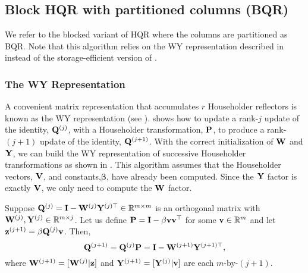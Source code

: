 \subsection{Block HQR with partitioned columns (BQR)}\label{sec:BQR}
We refer to the blocked variant of HQR where the columns are partitioned as BQR. 
Note that this algorithm relies on the WY representation described in \cite{Bischof1987} instead of the storage-efficient version of \cite{Schreiber1989}.
\subsubsection{The WY Representation}
A convenient matrix representation that accumulates $r$ Householder reflectors is known as the WY representation (see \cite{Bischof1987,golub2013matrix}).
 shows how to update a rank-$j$ update of the identity, $\mathbf{Q}^{(j)}$, with a Householder transformation, $\mathbf{P}$, to produce a rank-$(j+1)$ update of the identity, $\mathbf{Q}^{(j+1)}$. 
With the correct initialization of $\mathbf{W}$ and $\mathbf{Y}$, we can build the WY representation of successive Householder transformations as shown in . 
This algorithm assumes that the Householder vectors, $\mathbf{V}$, and constants,$\bm{\beta}$, have already been computed.
Since the $\mathbf{Y}$ factor is exactly $\mathbf{V}$, we only need to compute the $\mathbf{W}$ factor.
\begin{lemma}\label{lem:WY}
	Suppose $\mathbf{Q}^{(j)}=\mathbf{I}-\mathbf{W}^{(j)}\mathbf{Y}^{(j)\top}\in\mathbb{R}^{m\times m}$ is an orthogonal matrix with $\mathbf{W}^{(j)},\mathbf{Y}^{(j)}\in\mathbb{R}^{m\times j}$.
	Let us define $\mathbf{P}=\mathbf{I}-\beta\mathbf{vv}^{\top}$ for some $\mathbf{v}\in\mathbb{R}^m$ and let $\mathbf{z}^{(j+1)}=\beta\mathbf{Q}^{(j)}\mathbf{v}$.
	Then, \[\mathbf{Q}^{(j+1)} = \mathbf{Q}^{(j)}\mathbf{P} = \mathbf{I} - \mathbf{W}^{(j+1)}\mathbf{Y}^{(j+1)\top}, \]where $ \mathbf{W}^{(j+1)} =[\mathbf{W}^{(j)}|\mathbf{z}]$ and $ \mathbf{Y}^{(j+1)}=[\mathbf{Y}^{(j)}|\mathbf{v}]$ are each $m$-by-$(j+1)$. 
\end{lemma}
%

